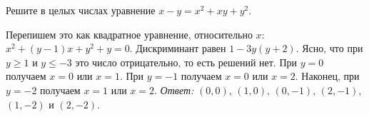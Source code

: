 Решите в целых числах уравнение $x - y = x^2 + x y + y^2$.

\solution
Перепишем это как квадратное уравнение, относительно $x$:
$x^2 + (y - 1) x + y^2 + y = 0$.
Дискриминант равен $1 - 3 y (y + 2)$.
Ясно, что при $y \geq 1$ и $y \leq -3$ это число отрицательно, то есть
решений нет.
При $y = 0$ получаем $x = 0$ или $x = 1$.
При $y = -1$ получаем $x = 0$ или $x = 2$.
Наконец, при $y = -2$ получаем $x = 1$ или $x = 2$.
\emph{Ответ:} $(0, 0)$, $(1, 0)$, $(0, -1)$, $(2, -1)$, $(1, -2)$ и $(2, -2)$.

